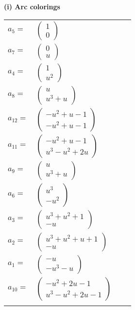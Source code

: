 \documentclass[1p]{elsarticle_modified}
\theoremstyle{definition}
\begin{document}
\flushleft \textbf{(i) Arc colorings}\\
\begin{tabular}{m{7pt} m{180pt} m{7pt} m{180pt} }
\flushright $a_{5}=$&$\begin{pmatrix}1\\0\end{pmatrix}$ \\
\flushright $a_{7}=$&$\begin{pmatrix}0\\u\end{pmatrix}$ \\
\flushright $a_{4}=$&$\begin{pmatrix}1\\u^2\end{pmatrix}$ \\
\flushright $a_{8}=$&$\begin{pmatrix}u\\u^3+u\end{pmatrix}$ \\
\flushright $a_{12}=$&$\begin{pmatrix}- u^2+u-1\\- u^2+u-1\end{pmatrix}$ \\
\flushright $a_{11}=$&$\begin{pmatrix}- u^2+u-1\\u^3- u^2+2 u\end{pmatrix}$ \\
\flushright $a_{9}=$&$\begin{pmatrix}u\\u^3+u\end{pmatrix}$ \\
\flushright $a_{6}=$&$\begin{pmatrix}u^3\\- u^2\end{pmatrix}$ \\
\flushright $a_{3}=$&$\begin{pmatrix}u^3+u^2+1\\- u\end{pmatrix}$ \\
\flushright $a_{2}=$&$\begin{pmatrix}u^3+u^2+u+1\\- u\end{pmatrix}$ \\
\flushright $a_{1}=$&$\begin{pmatrix}- u\\- u^3- u\end{pmatrix}$ \\
\flushright $a_{10}=$&$\begin{pmatrix}- u^2+2 u-1\\u^3- u^2+2 u-1\end{pmatrix}$\\&\end{tabular}
\end{document}
